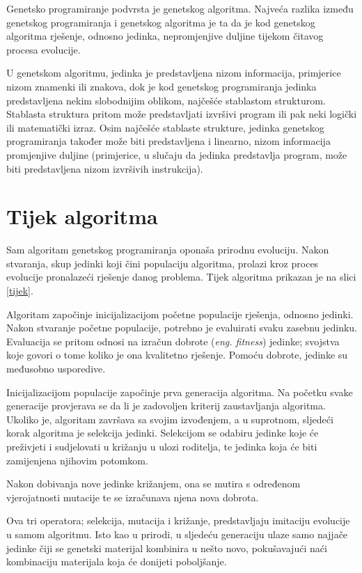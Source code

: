 Genetsko programiranje podvrsta je genetskog algoritma. Najveća razlika između genetskog programiranja i genetskog algoritma je ta da je kod genetskog algoritma rješenje, odnosno jedinka, nepromjenjive duljine tijekom čitavog procesa evolucije.

U genetskom algoritmu, jedinka je predstavljena nizom informacija, primjerice nizom znamenki ili znakova, dok je kod genetskog programiranja jedinka predstavljena nekim slobodnijim oblikom, najčešće stablastom strukturom. Stablasta struktura pritom može predstavljati izvršivi program ili pak neki logički ili matematički izraz. Osim najčešće stablaste strukture, jedinka genetskog programiranja također može biti predstavljena i linearno, nizom informacija promjenjive duljine (primjerice, u slučaju da jedinka predstavlja program, može biti predstavljena nizom izvršivih instrukcija).

\section{Tijek algoritma}

Sam algoritam genetskog programiranja oponaša prirodnu evoluciju. Nakon stvaranja, skup jedinki koji čini populaciju algoritma, prolazi kroz proces evolucije pronalazeći rješenje danog problema. Tijek algoritma prikazan je na slici \ref{tijek}.

Algoritam započinje inicijalizacijom početne populacije rješenja, odnosno jedinki. Nakon stvaranje početne populacije, potrebno je evaluirati svaku zasebnu jedinku. Evaluacija se pritom odnosi na izračun dobrote (\textit{eng. fitness}) jedinke; svojstva koje govori o tome koliko je ona kvalitetno rješenje. Pomoću dobrote, jedinke su međusobno usporedive.

Inicijalizacijom populacije započinje prva generacija algoritma. Na početku svake generacije provjerava se da li je zadovoljen kriterij zaustavljanja algoritma. Ukoliko je, algoritam završava sa svojim izvođenjem, a u suprotnom, sljedeći korak algoritma je selekcija jedinki. 
Selekcijom se odabiru jedinke koje će preživjeti i sudjelovati u križanju u ulozi roditelja, te jedinka koja će biti zamijenjena njihovim potomkom.

Nakon dobivanja nove jedinke križanjem, ona se mutira s određenom vjerojatnosti mutacije te se izračunava njena nova dobrota.

Ova tri operatora; selekcija, mutacija i križanje, predstavljaju imitaciju evolucije u samom algoritmu. Isto kao u prirodi, u sljedeću generaciju ulaze samo najjače jedinke čiji se genetski materijal kombinira u nešto novo, pokušavajući naći kombinaciju materijala koja će donijeti poboljšanje.


